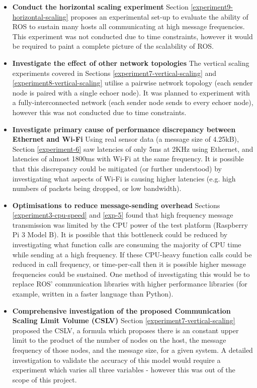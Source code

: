 \documentclass[../dissertation.tex]{subfiles}
\begin{document}
\begin{itemize}

  \item \textbf{Conduct the horizontal scaling experiment} Section \ref{experiment9-horizontal-scaling} proposes an experimental set-up to evaluate the ability of ROS to sustain many hosts all communicating at high message frequencies. This experiment was not conducted due to time constraints, however it would be required to paint a complete picture of the scalability of ROS.

  \item \textbf{Investigate the effect of other network topologies} The vertical scaling experiments covered in Sections \ref{experiment7-vertical-scaling} and \ref{experiment8-vertical-scaling} utilise a pairwise network topology (each sender node is paired with a single echoer node). It was planned to experiment with a fully-interconnected network (each sender node sends to every echoer node), however this was not conducted due to time constraints.

	\item \textbf{Investigate primary cause of performance discrepancy between Ethernet and Wi-Fi} Using real sensor data (a message size of 4.25kB), Section \ref{experiment-6} saw latencies of only 5ms at 2KHz using Ethernet, and latencies of almost 1800ms with Wi-Fi at the same frequency. It is possible that this discrepancy could be mitigated (or further understood) by investigating what aspects of Wi-Fi is causing higher latencies (e.g. high numbers of packets being dropped, or low bandwidth).

  \item \textbf{Optimisations to reduce message-sending overhead} Sections \ref{experiment3-cpu-speed} and \ref{exp-5} found that high frequency message transmission was limited by the CPU power of the test platform (Raspberry Pi 3 Model B). It is possible that this bottleneck could be reduced by investigating what function calls are consuming the majority of CPU time while sending at a high frequency. If these CPU-heavy function calls could be reduced in call frequency, or time-per-call then it is possible higher message frequencies could be sustained. One method of investigating this would be to replace ROS' communication libraries with higher performance libraries (for example, written in a faster language than Python).

  \item \textbf{Comprehensive investigation of the proposed Communication Scaling Limit Volume (CSLV)} Section \ref{experiment7-vertical-scaling} proposed the CSLV, a formula which proposes there is an constant upper limit to the product of the number of nodes on the host, the message frequency of those nodes, and the message size, for a given system. A detailed investigation to validate the accuracy of this model would require a experiment which varies all three variables - however this was out of the scope of this project.


\end{itemize}
\end{document}
